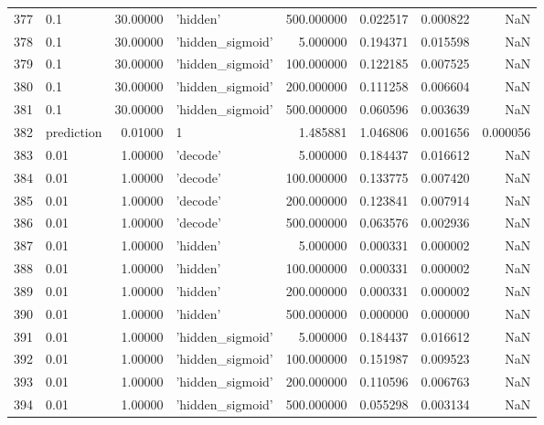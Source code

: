 \documentclass[10pt,a4paper]{article}
\begin{document}
\begin{tabular}{llrlrrrr}
377  &         0.1 &  30.00000 &           'hidden' &  500.000000 &  0.022517 &  0.000822 &       NaN \\
378  &         0.1 &  30.00000 &   'hidden\_sigmoid' &    5.000000 &  0.194371 &  0.015598 &       NaN \\
379  &         0.1 &  30.00000 &   'hidden\_sigmoid' &  100.000000 &  0.122185 &  0.007525 &       NaN \\
380  &         0.1 &  30.00000 &   'hidden\_sigmoid' &  200.000000 &  0.111258 &  0.006604 &       NaN \\
381  &         0.1 &  30.00000 &   'hidden\_sigmoid' &  500.000000 &  0.060596 &  0.003639 &       NaN \\
382  &  prediction &   0.01000 &                  1 &    1.485881 &  1.046806 &  0.001656 &  0.000056 \\
383  &        0.01 &   1.00000 &           'decode' &    5.000000 &  0.184437 &  0.016612 &       NaN \\
384  &        0.01 &   1.00000 &           'decode' &  100.000000 &  0.133775 &  0.007420 &       NaN \\
385  &        0.01 &   1.00000 &           'decode' &  200.000000 &  0.123841 &  0.007914 &       NaN \\
386  &        0.01 &   1.00000 &           'decode' &  500.000000 &  0.063576 &  0.002936 &       NaN \\
387  &        0.01 &   1.00000 &           'hidden' &    5.000000 &  0.000331 &  0.000002 &       NaN \\
388  &        0.01 &   1.00000 &           'hidden' &  100.000000 &  0.000331 &  0.000002 &       NaN \\
389  &        0.01 &   1.00000 &           'hidden' &  200.000000 &  0.000331 &  0.000002 &       NaN \\
390  &        0.01 &   1.00000 &           'hidden' &  500.000000 &  0.000000 &  0.000000 &       NaN \\
391  &        0.01 &   1.00000 &   'hidden\_sigmoid' &    5.000000 &  0.184437 &  0.016612 &       NaN \\
392  &        0.01 &   1.00000 &   'hidden\_sigmoid' &  100.000000 &  0.151987 &  0.009523 &       NaN \\
393  &        0.01 &   1.00000 &   'hidden\_sigmoid' &  200.000000 &  0.110596 &  0.006763 &       NaN \\
394  &        0.01 &   1.00000 &   'hidden\_sigmoid' &  500.000000 &  0.055298 &  0.003134 &       NaN \\

\end{tabular}
\end{document}
